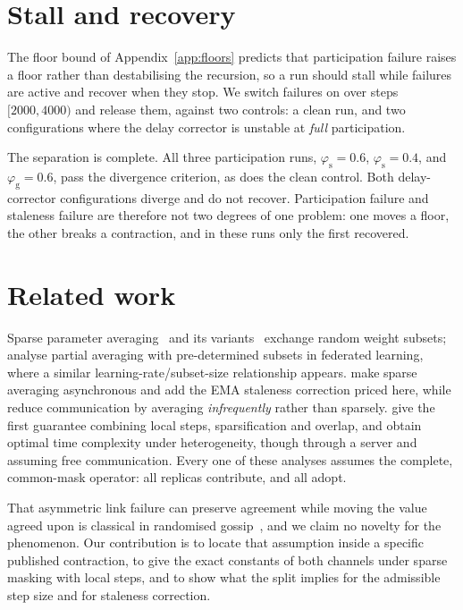 \documentclass{article}
\theoremstyle{plain}
\newcommand{\pg}{\varphi_{\mathrm{g}}}
\newcommand{\ps}{\varphi_{\mathrm{s}}}
\begin{document}
\section{Stall and recovery}\label{app:stall}

The floor bound of Appendix~\ref{app:floors} predicts that participation failure raises a floor
rather than destabilising the recursion, so a run should stall while failures
are active and recover when they stop. We switch failures on over steps
$[2000, 4000)$ and release them, against two controls: a clean run, and two
configurations where the delay corrector is unstable at \emph{full}
participation.

The separation is complete. All three participation runs, $\ps = 0.6$,
$\ps = 0.4$, and $\pg = 0.6$, pass the divergence criterion, as does the
clean control. Both delay-corrector configurations diverge and do not recover.
Participation failure and staleness failure are therefore not two degrees of
one problem: one moves a floor, the other breaks a contraction, and in these
runs only the first recovered.

\section{Related work}\label{app:related}

Sparse parameter averaging~\citep{beton2025sparta} and its
variants~\citep{fournier2024wash} exchange random weight subsets;
\citet{lee2023partial} analyse partial averaging with pre-determined subsets in
federated learning, where a similar learning-rate/subset-size relationship
appears. \citet{ajanthan2026asyncmesh} make sparse averaging asynchronous and add
the EMA staleness correction priced here, while
\citet{douillard2023diloco} reduce communication by averaging \emph{infrequently}
rather than sparsely. \citet{maziane2026loscar} give the first guarantee
combining local steps, sparsification and overlap, and
\citet{maranjyan2026ringleader} obtain optimal time complexity under
heterogeneity, though through a server and assuming free communication. Every one
of these analyses assumes the complete, common-mask operator: all replicas
contribute, and all adopt.

That asymmetric link failure can preserve agreement while moving the value agreed
upon is classical in randomised gossip~\citep{fagnani2008randomized}, and we
claim no novelty for the phenomenon. Our contribution is to locate that
assumption inside a specific published contraction, to give the exact constants
of both channels under sparse masking with local steps, and to show what the
split implies for the admissible step size and for staleness correction.
\end{document}
